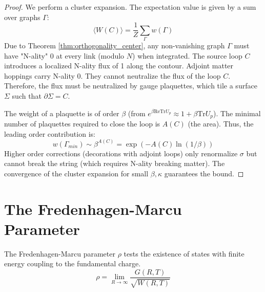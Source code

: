 \begin{proof}
We perform a cluster expansion. The expectation value is given by a sum over graphs $\Gamma$:
\begin{equation}
\langle W(C) \rangle = \frac{1}{Z} \sum_{\Gamma} w(\Gamma)
\end{equation}
Due to Theorem \ref{thm:orthogonality_center}, any non-vanishing graph $\Gamma$ must have "N-ality" 0 at every link (modulo $N$) when integrated.
The source loop $C$ introduces a localized N-ality flux of 1 along the contour.
Adjoint matter hoppings carry N-ality 0. They cannot neutralize the flux of the loop $C$.
Therefore, the flux must be neutralized by gauge plaquettes, which tile a surface $\Sigma$ such that $\partial \Sigma = C$.

The weight of a plaquette is of order $\beta$ (from $e^{\beta \mathrm{ReTr} U_p} \approx 1 + \beta \mathrm{Tr} U_p$).
The minimal number of plaquettes required to close the loop is $A(C)$ (the area).
Thus, the leading order contribution is:
\begin{equation}
w(\Gamma_{min}) \sim \beta^{A(C)} = \exp(-A(C) \ln(1/\beta))
\end{equation}
Higher order corrections (decorations with adjoint loops) only renormalize $\sigma$ but cannot break the string (which requires N-ality breaking matter).
The convergence of the cluster expansion for small $\beta, \kappa$ guarantees the bound.
\end{proof}

\section{The Fredenhagen-Marcu Parameter}

\begin{definition}
The Fredenhagen-Marcu parameter $\rho$ tests the existence of states with finite energy coupling to the fundamental charge.
\begin{equation}
\rho = \lim_{R \to \infty} \frac{G(R, T)}{\sqrt{W(R, T)}}
\end{equation}
\end{definition}

